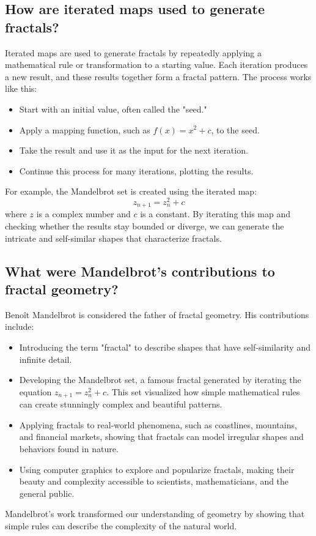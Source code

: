\documentclass[12pt]{article}
\begin{document}
\subsection{How are iterated maps used to generate fractals?}
Iterated maps are used to generate fractals by repeatedly applying a mathematical rule or transformation to a starting value. Each iteration produces a new result, and these results together form a fractal pattern. The process works like this:
\begin{itemize}
    \item Start with an initial value, often called the "seed."
    \item Apply a mapping function, such as \( f(x) = x^2 + c \), to the seed.
    \item Take the result and use it as the input for the next iteration.
    \item Continue this process for many iterations, plotting the results.
\end{itemize}

For example, the Mandelbrot set is created using the iterated map:
\[
z_{n+1} = z_n^2 + c
\]
where \( z \) is a complex number and \( c \) is a constant. By iterating this map and checking whether the results stay bounded or diverge, we can generate the intricate and self-similar shapes that characterize fractals.

\subsection{What were Mandelbrot's contributions to fractal geometry?}
Benoît Mandelbrot is considered the father of fractal geometry. His contributions include:
\begin{itemize}
    \item Introducing the term "fractal" to describe shapes that have self-similarity and infinite detail.
    \item Developing the Mandelbrot set, a famous fractal generated by iterating the equation \( z_{n+1} = z_n^2 + c \). This set visualized how simple mathematical rules can create stunningly complex and beautiful patterns.
    \item Applying fractals to real-world phenomena, such as coastlines, mountains, and financial markets, showing that fractals can model irregular shapes and behaviors found in nature.
    \item Using computer graphics to explore and popularize fractals, making their beauty and complexity accessible to scientists, mathematicians, and the general public.
\end{itemize}
Mandelbrot's work transformed our understanding of geometry by showing that simple rules can describe the complexity of the natural world.
\end{document}
